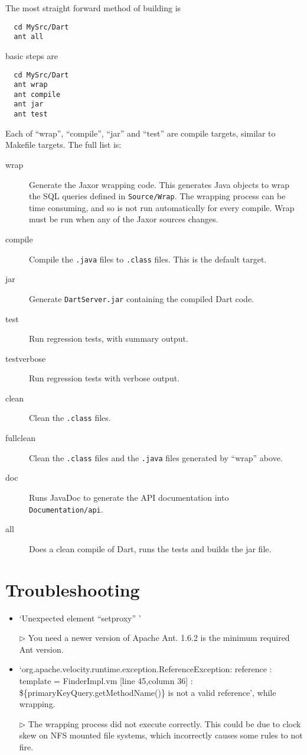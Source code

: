 \documentclass{InsightBook}
\newcommand{\answermark}{$\triangleright$ }
\newcommand{\filename}[1]{\texttt{#1}}
\begin{document}
The most straight forward method of building is
\begin{verbatim}
  cd MySrc/Dart
  ant all
\end{verbatim}
 basic steps are
\begin{verbatim}
  cd MySrc/Dart
  ant wrap
  ant compile
  ant jar
  ant test
\end{verbatim}

Each of ``wrap'', ``compile'', ``jar'' and ``test'' are compile
targets, similar to Makefile targets. The full list is:
\begin{description}
\item[wrap] Generate the Jaxor wrapping code. This generates Java
  objects to wrap the SQL queries defined in \texttt{Source/Wrap}. The
  wrapping process can be time consuming, and so is not run
  automatically for every compile.  Wrap must be run when any of the
  Jaxor sources changes.
\item[compile] Compile the \filename{.java} files to \filename{.class}
  files. This is the default target.
\item[jar] Generate \filename{DartServer.jar} containing the compiled
  Dart code.
\item[test] Run regression tests, with summary output.
\item[testverbose] Run regression tests with verbose output.
\item[clean] Clean the \filename{.class} files.
\item[fullclean] Clean the \filename{.class} files and the
  \filename{.java} files generated by ``wrap'' above.
\item[doc] Runs JavaDoc to generate the API documentation into
  \filename{Documentation/api}.
\item[all] Does a clean compile of Dart, runs the tests and builds the
jar file.
\end{description}

\section{Troubleshooting}

\begin{itemize}
\item `Unexpected element ``setproxy'' '

  \answermark You need a newer version of Apache Ant. 1.6.2 is the minimum required Ant version.

\item `org.apache.velocity.runtime.exception.ReferenceException:
  reference : template = FinderImpl.vm [line 45,column 36] :
  \$\{primaryKeyQuery.getMethodName()\} is not a valid reference',
  while wrapping.

  \answermark The wrapping process did not execute correctly. This could be due to
  clock skew on NFS mounted file systems, which incorrectly causes some
  rules to not fire.

\end{itemize}
\end{document}
